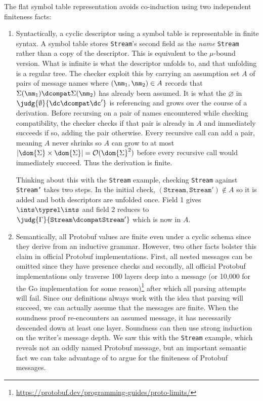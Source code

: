 The flat symbol table representation avoids co-induction using two independent
finiteness facts:
\begin{enumerate}
\item Syntactically, a cyclic descriptor using a symbol table is representable
  in finite syntax. A symbol table stores \texttt{Stream}'s second field as the
  \emph{name} \texttt{Stream} rather than a copy of the descriptor. This is
  equivalent to the $\mu$-bound version. What is infinite is what the descriptor
  unfolds to, and that unfolding is a regular tree. The checker exploit this by
  carrying an assumption set $A$ of pairs of message names where
  $(\nm_1, \nm_2) \in A$ records that $\Sigma(\nm_1) \dcompat \Sigma(\nm_2)$ has already been assumed. It
  is what the $\varnothing$ in $\judg{\emptyset}{\dc \dcompat \dc'}$ is referencing and grows
  over the course of a derivation. Before recursing on a pair of names
  encountered while checking compatibility, the checker checks if that pair is
  already in $A$ and immediately succeeds if so, adding the pair
  otherwise. Every recursive call can add a pair, meaning $A$ never shrinks so $A$ can
  grow to at most
  $|\dom{\Sigma} \times \dom{\Sigma}| = \mathcal{O}(\dom{\Sigma}^2)$ before every recursive call would
  immediately succeed. Thus the derivation is finite.

  Thinking about this with the \texttt{Stream} example, checking \texttt{Stream}
  against \texttt{Stream'} takes two steps. In the initial check,
  $(\mathtt{Stream}, \mathtt{Stream'}) \not \in A$ so it is added and both
  descriptors are unfolded once. Field 1 gives $\ints \typrel \ints$ and field 2
  reduces to $\judg{\Gamma}{\mathtt{Stream} \dcompat \mathtt{Stream'}}$ which is now in $A$.
\item Semantically, all Protobuf values are finite even under a cyclic schema
  since they derive from an inductive grammar. However, two other facts bolster
  this claim in official Protobuf implementations. First, all nested messages
  can be omitted since they have presence checks and secondly, all official
  Protobuf implementations only traverse 100 layers deep into a message (or
  10,000 for the Go implementation for some
  reason)\footnote{\url{https://protobuf.dev/programming-guides/proto-limits/}}
  after which all parsing attempts will fail. Since our definitions always work
  with the idea that parsing will succeed, we can actually assume that the
  messages are finite. When the soundness proof re-encounters an assumed
  message, it has necessarily descended down at least one layer. Soundness can
  then use strong induction on the writer's message depth. We saw this with the
  \texttt{Stream} example, which reveals not an oddly named Protobuf message,
  but an important semantic fact we can take advantage of to argue for the
  finiteness of Protobuf messages.
\end{enumerate}

